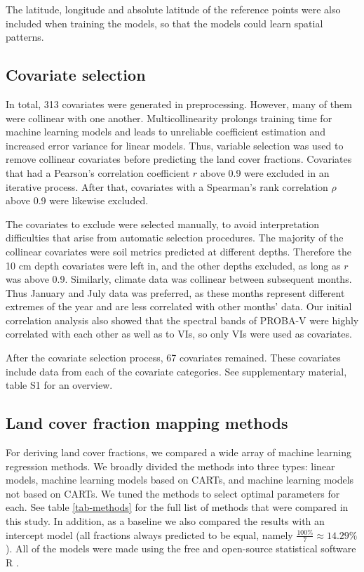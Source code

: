 \documentclass[review,authoryear,3p]{elsarticle}
\begin{document}
The latitude, longitude and absolute latitude of the reference points were also included when training the models, so that the models could learn spatial patterns.

\subsection{Covariate selection}
\label{sec-covariate-selection}

In total, 313 covariates were generated in preprocessing.
However, many of them were collinear with one another.
Multicollinearity prolongs training time for machine learning models and leads to unreliable coefficient estimation and increased error variance for linear models.
Thus, variable selection was used to remove collinear covariates before predicting the land cover fractions.
Covariates that had a Pearson's correlation coefficient $r$ \citep{pearson_notes_1895} above 0.9 were excluded in an iterative process.
After that, covariates with a Spearman's rank correlation $\rho$ \citep{spearman1904rank} above 0.9 were likewise excluded.

The covariates to exclude were selected manually, to avoid interpretation difficulties that arise from automatic selection procedures.
The majority of the collinear covariates were soil metrics predicted at different depths.
Therefore the 10 cm depth covariates were left in, and the other depths excluded, as long as $r$ was above 0.9.
Similarly, climate data was collinear between subsequent months. Thus January and July data was preferred, as these months represent different extremes of the year and are less correlated with other months' data.
Our initial correlation analysis also showed that the spectral bands of PROBA-V were highly correlated with each other as well as to \glspl{VI}, so only \glspl{VI} were used as covariates.

After the covariate selection process, 67 covariates remained.
These covariates include data from each of the covariate categories.
See supplementary material, table S1 for an overview.

\subsection{Land cover fraction mapping methods}

For deriving land cover fractions, we compared a wide array of machine learning regression methods.
We broadly divided the methods into three types: linear models, machine learning models based on \glspl{CART}, and machine learning models not based on \glspl{CART}.
We tuned the methods to select optimal parameters for each.
See table \ref{tab-methods} for the full list of methods that were compared in this study.
In addition, as a baseline we also compared the results with an intercept model (all fractions always predicted to be equal, namely $\frac{100\%}{7}\approx14.29\%$).
All of the models were made using the free and open-source statistical software R \citep{r_2019}.
\end{document}
